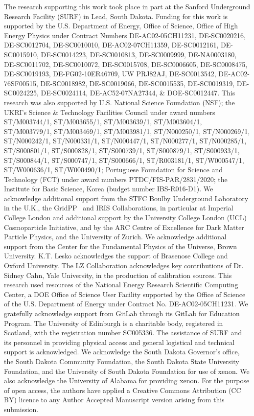 \documentclass[reprint, showpacs,
preprintnumbers,
amsmath,amssymb,
aps, floatfix,
superscriptaddress,
prd, nofootinbib]{revtex4-1}
\begin{document}
\begin{acknowledgments}
The research supporting this work took place in part at the Sanford Underground Research Facility (SURF) in Lead, South Dakota. 
Funding for this work is supported by the U.S. Department of Energy, Office of Science, Office of High Energy Physics under Contract Numbers DE-AC02-05CH11231, DE-SC0020216, DE-SC0012704, DE-SC0010010, DE-AC02-07CH11359, DE-SC0012161, DE-SC0015910, DE-SC0014223, DE-SC0010813, DE-SC0009999, DE-NA0003180, DE-SC0011702, DE-SC0010072, DE-SC0015708, DE-SC0006605, DE-SC0008475, DE-SC0019193, DE-FG02-10ER46709, UW PRJ82AJ, DE-SC0013542, DE-AC02-76SF00515, DE-SC0018982, DE-SC0019066, DE-SC0015535, DE-SC0019319, DE-SC0024225, DE-SC0024114, DE-AC52-07NA27344, \& DOE-SC0012447.
This research was also supported by U.S. National Science Foundation (NSF); the UKRI’s Science \& Technology Facilities Council under award numbers ST/M003744/1, ST/M003655/1, ST/M003639/1, ST/M003604/1, ST/M003779/1, ST/M003469/1, ST/M003981/1, ST/N000250/1, ST/N000269/1, ST/N000242/1, ST/N000331/1, ST/N000447/1, ST/N000277/1, ST/N000285/1, ST/S000801/1, ST/S000828/1, ST/S000739/1, ST/S000879/1, ST/S000933/1, ST/S000844/1, ST/S000747/1, ST/S000666/1, ST/R003181/1, ST/W000547/1, ST/W000636/1, ST/W000490/1; Portuguese Foundation for Science and Technology (FCT) under award numbers PTDC/FIS-PAR/2831/2020; the Institute for Basic Science, Korea (budget number IBS-R016-D1). 
We acknowledge additional support from the STFC Boulby Underground Laboratory in the U.K., the GridPP~\cite{faulkner2005gridpp,britton2009gridpp} and IRIS Collaborations, in particular at Imperial College London and additional support by the University College London (UCL) Cosmoparticle Initiative, and by the ARC Centre of Excellence for Dark Matter Particle Physics, and the University of Zurich.
We acknowledge additional support from the Center for the Fundamental Physics of the Universe, Brown University. 
K.T. Lesko acknowledges the support of Brasenose College and Oxford University. 
The LZ Collaboration acknowledges key contributions of Dr. Sidney Cahn, Yale University, in the production of calibration sources. 
This research used resources of the National Energy Research Scientific Computing Center, a DOE Office of Science User Facility supported by the Office of Science of the U.S. Department of Energy under Contract No. DE-AC02-05CH11231. We gratefully acknowledge support from GitLab through its GitLab for Education Program. 
The University of Edinburgh is a charitable body, registered in Scotland, with the registration number SC005336. 
The assistance of SURF and its personnel in providing physical access and general logistical and technical support is acknowledged. We acknowledge the South Dakota Governor's office, the South Dakota Community Foundation, the South Dakota State University Foundation, and the University of South Dakota Foundation for use of xenon.
We also acknowledge the University of Alabama for providing xenon.
For the purpose of open access, the authors have applied a Creative Commons Attribution (CC BY) licence to any Author Accepted Manuscript version arising from this submission.
\end{acknowledgments}
\end{document}
